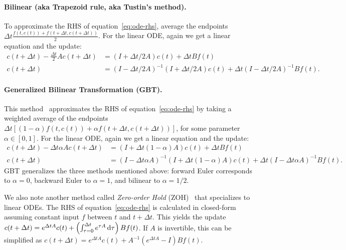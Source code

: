 \documentclass[../hippo.tex]{subfiles}
\begin{document}
\paragraph{Bilinear (aka Trapezoid rule, aka Tustin's method).}
To approximate the RHS of equation~\eqref{eq:ode-rhs}, average the endpoints
$\Delta t \frac{f(t, c(t))+f(t+\Delta t, c(t+\Delta t))}{2}$.
For the linear ODE, again we get a linear equation and the update:
\begin{align*}
  c(t + \Delta t) - \frac{\Delta t}{2} A c(t + \Delta t) &= (I + \Delta t/2 A) c(t) + \Delta t B f(t) \\
  c(t + \Delta t) &= (I - \Delta t/2 A)^{-1}(I + \Delta t/2 A) c(t) + \Delta t (I - \Delta t/2 A)^{-1} B f(t).
\end{align*}

\paragraph{Generalized Bilinear Transformation (GBT).}
This method~\citep{zhang2007performance} approximates the RHS of
equation~\eqref{eq:ode-rhs} by taking a weighted average of the endpoints
$\Delta t [(1 - \alpha) f(t, c(t)) + \alpha f(t+\Delta t, c(t+\Delta t))]$, for some parameter $\alpha \in [0, 1]$.
For the linear ODE, again we get a linear equation and the update:
\begin{align}
  c(t + \Delta t) - \Delta t \alpha A c(t + \Delta t) &= (I + \Delta t (1 - \alpha) A) c(t) + \Delta t B f(t) \nonumber \\
  c(t + \Delta t) &= (I - \Delta t \alpha A)^{-1}(I + \Delta t (1 - \alpha) A) c(t) + \Delta t (I - \Delta t \alpha A)^{-1} B f(t).
  \label{eq:gbt}
\end{align}
GBT generalizes the three methods mentioned above: forward Euler corresponds to
$\alpha = 0$, backward Euler to $\alpha = 1$, and bilinear to $\alpha = 1/2$.

We also note another method called \emph{Zero-order Hold}
(ZOH)~\citep{decarlo1989linear} that specializes to linear ODEs.
The RHS of equation~\eqref{eq:ode-rhs} is calculated in closed-form assuming
constant input $f$ between $t$ and $t + \Delta t$.
This yields the update
$c(t + \Delta t) = e^{\Delta t A} c(t) + \left( \int_{\tau=0}^{\Delta t} e^{\tau A} \mathop{}\!\mathrm{d} \tau \right) B f(t)$.
If $A$ is invertible, this can be simplified as
$c(t + \Delta t) = e^{\Delta t A} c(t) + A^{-1} (e^{\Delta t A} - I) B f(t)$.
\end{document}
